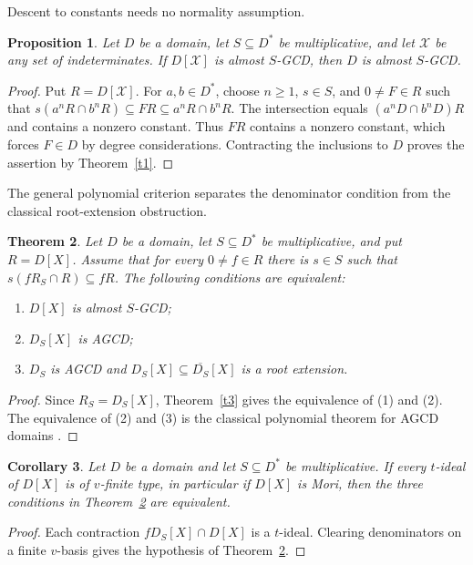 \documentclass[11pt]{amsart}
\newtheorem{theorem}{Theorem}[section]
\newtheorem{proposition}[theorem]{Proposition}
\newtheorem{corollary}[theorem]{Corollary}
\theoremstyle{definition}
\theoremstyle{remark}
\begin{document}
Descent to constants needs no normality assumption.

\begin{proposition}\label{p:poly-descent-to-D}
Let $D$ be a domain, let $S\subseteq D^\ast$ be multiplicative,
and let $\mathcal X$ be any set of indeterminates.
If $D[\mathcal X]$ is almost $S$-GCD, then $D$ is almost $S$-GCD.
\end{proposition}
\begin{proof}
Put $R=D[\mathcal X]$. For $a,b\in D^\ast$, choose $n\geq1$,
$s\in S$, and $0\ne F\in R$ such that
$s(a^nR\cap b^nR)\subseteq FR\subseteq a^nR\cap b^nR$.
The intersection equals $(a^nD\cap b^nD)R$ and contains a
nonzero constant. Thus $FR$ contains a nonzero constant, which
forces $F\in D$ by degree considerations. Contracting the
inclusions to $D$ proves the assertion by Theorem~\ref{t1}.
\end{proof}

The general polynomial criterion separates the denominator condition
from the classical root-extension obstruction.

\begin{theorem}\label{t:poly-localization-criterion}
Let $D$ be a domain, let $S\subseteq D^\ast$ be multiplicative,
and put $R=D[X]$. Assume that for every $0\ne f\in R$ there
is $s\in S$ such that $s(fR_S\cap R)\subseteq fR$.
The following conditions are equivalent:
\begin{enumerate}
\item $D[X]$ is almost $S$-GCD;
\item $D_S[X]$ is AGCD;
\item $D_S$ is AGCD and $D_S[X]\subseteq\overline{D_S}[X]$
is a root extension.
\end{enumerate}
\end{theorem}
\begin{proof}
Since $R_S=D_S[X]$, Theorem~\ref{t3} gives the equivalence of
(1) and (2). The equivalence of (2) and (3) is the classical
polynomial theorem for AGCD domains \cite[Theorem~3.4]{ATZ}.
\end{proof}

\begin{corollary}\label{c:poly-t-finite}
Let $D$ be a domain and let $S\subseteq D^\ast$ be multiplicative.
If every $t$-ideal of $D[X]$ is of $v$-finite type, in particular
if $D[X]$ is Mori, then the three conditions in
Theorem~\ref{t:poly-localization-criterion} are equivalent.
\end{corollary}
\begin{proof}
Each contraction $fD_S[X]\cap D[X]$ is a $t$-ideal.
Clearing denominators on a finite $v$-basis gives the hypothesis
of Theorem~\ref{t:poly-localization-criterion}.
\end{proof}
\end{document}

